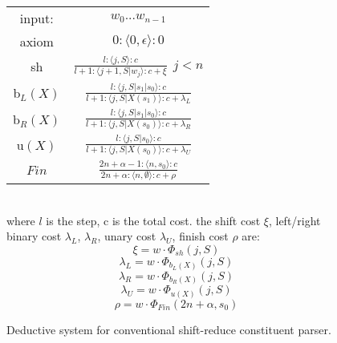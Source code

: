 \begin{figure}[t]
		\begin{tabular}{c c}
		input: & $w_0...w_{n-1}$\\[5pt]
		axiom & $0:\langle0,\epsilon\rangle:0$\\[5pt]
		sh &	
			$\displaystyle \frac{l:\langle j,S\rangle:c} 
			{l+1:\langle j+1, S|w_j\rangle:c+\xi}\ \ j<n$ 
		\\[10pt]
	
		b$_L(X)$ & 
			$\displaystyle \frac{l:\langle j,S|s_1|s_0\rangle:c}
			{l+1:\langle j, S|X(s_1)\rangle:c+\lambda_L}$ 
		\\[10pt]
		b$_R(X)$ & 
			$\displaystyle \frac{l:\langle j,S|s_1|s_0\rangle:c}
			{l+1:\langle j, S|X(s_0)\rangle:c+\lambda_R}$
		\\[10pt]
		
		u$(X)$ & 
			$\displaystyle \frac{l:\langle j,S|s_0\rangle:c}
			{l+1:\langle j, S|X(s_0)\rangle:c+\lambda_U}$
		\\[10pt]
		
		$Fin$ & 
			$\displaystyle \frac{2n+\alpha-1:\langle n,s_0\rangle:c}
			{2n+\alpha:\langle n, \emptyset \rangle:c+\rho}$
		\\[10pt]
		\end{tabular}
	\\
	where $l$ is the step, c is the total cost. the shift cost $\xi$, left/right binary cost $\lambda_L$, $\lambda_R$, unary cost $\lambda_U$, finish cost $\rho$ are:
	\\
	\begin{equation}		\xi = w \cdot \Phi_{sh}(j,S)  \end{equation}
	\begin{equation}		\lambda_L = w \cdot \Phi_{b_L(X)}(j,S) 	\end{equation}
	\begin{equation}		\lambda_R = w \cdot \Phi_{b_R(X)}(j,S) 	\end{equation}
	\begin{equation}		\lambda_U = w \cdot \Phi_{u(X)}(j,S) 	\end{equation}
	\begin{equation}		\rho = w \cdot \Phi_{Fin}(2n+\alpha,s_0) 	\end{equation}

	\caption{\label{deductive}Deductive system for conventional shift-reduce constituent parser.}
\end{figure}